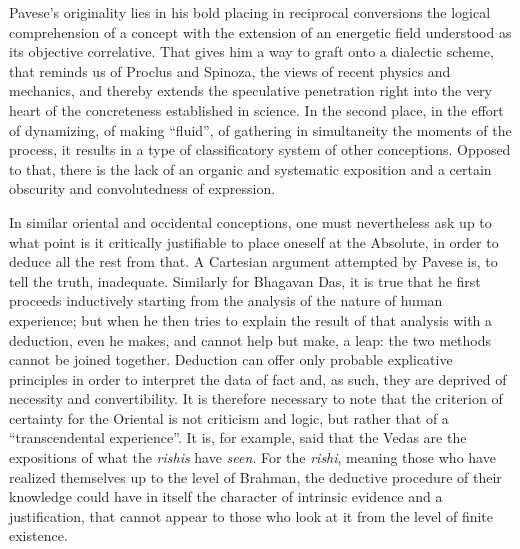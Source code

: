 Pavese's originality lies in his bold placing in reciprocal conversions the logical comprehension of a concept with the extension of an energetic field understood as its objective correlative. That gives him a way to graft onto a dialectic scheme, that reminds us of Proclus and Spinoza, the views of recent physics and mechanics, and thereby extends the speculative penetration right into the very heart of the concreteness established in science. In the second place, in the effort of dynamizing, of making ``fluid'', of gathering in simultaneity the moments of the process, it results in a type of classificatory system of other conceptions. Opposed to that, there is the lack of an organic and systematic exposition and a certain obscurity and convolutedness of expression.

In similar oriental and occidental conceptions, one must nevertheless ask up to what point is it critically justifiable to place oneself at the Absolute, in order to deduce all the rest from that. A Cartesian argument attempted by Pavese is, to tell the truth, inadequate. Similarly for Bhagavan Das, it is true that he first proceeds inductively starting from the analysis of the nature of human experience; but when he then tries to explain the result of that analysis with a deduction, even he makes, and cannot help but make, a leap: the two methods cannot be joined together. Deduction can offer only probable explicative principles in order to interpret the data of fact and, as such, they are deprived of necessity and convertibility. It is therefore necessary to note that the criterion of certainty for the Oriental is not criticism and logic, but rather that of a ``transcendental experience''. It is, for example, said that the Vedas are the expositions of what the \emph{rishis} have \emph{seen}. For the \emph{rishi}, meaning those who have realized themselves up to the level of Brahman, the deductive procedure of their knowledge could have in itself the character of intrinsic evidence and a justification, that cannot appear to those who look at it from the level of finite existence.





